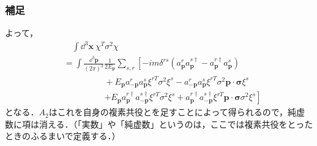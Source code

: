 \documentclass[pdflatex,unicode,ja=standard,12pt]{beamer}
\begin{document}
\begin{frame}[noframenumbering]
  
  \frametitle{補足\ \subsecname}
  \thispagestyle{empty}

  よって，
  \begin{align}
    &\quad
    \int\dd^3\mathbf{x}\ 
    \chi^{T}\sigma^{2}\chi
    \nonumber
    \\
    &=
    \int\frac{\dd^3\mathbf{p}}{(2\pi)^3}\frac{1}{2E_{\mathbf{p}}}\sum_{s,r}
    \left[  
      -im\delta^{rs}
      (
        a_{\mathbf{p}}^ra_{\mathbf{p}}^{s\dag}
        -
        a_{\mathbf{p}}^{r\dag}a_{\mathbf{p}}^s
      )
    \right.
    \nonumber
    \\
    &\hspace{2cm}
    +
    E_{\mathbf{p}}a_{-\mathbf{p}}^ra_{\mathbf{p}}^s
    \xi^{rT}
    \sigma^2
    \xi^s
    -
    a_{-\mathbf{p}}^ra_{\mathbf{p}}^s
    \xi^{rT}\sigma^2
    \mathbf{p}\cdot\bm{\sigma}
    \xi^s
    \nonumber
    \\
    &\hspace{2cm}
    \left.
      +
      E_{\mathbf{p}}a_{\mathbf{p}}^{r\dag}a_{-\mathbf{p}}^{s\dag}
      \xi^{rT}\sigma^2\xi^s
      +
      a_{\mathbf{p}}^{r\dag}a_{-\mathbf{p}}^{s\dag}
      \xi^{rT}\mathbf{p}\cdot\bm{\sigma}\sigma^2\xi^s
    \right]
  \end{align}
  となる．$A_2$はこれを自身の複素共役とを足すことによって得られるので，純虚数に項は消える．（「実数」や「純虚数」というのは，ここでは複素共役をとったときのふるまいで定義する．）

\end{frame}
\end{document}
